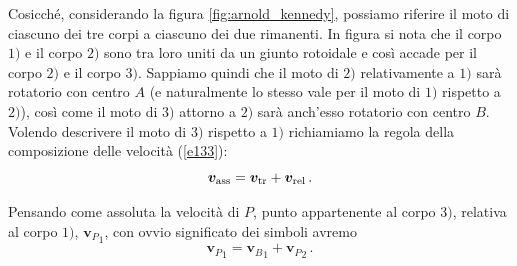 \noindent Cosicch\'e, considerando la figura \ref{fig:arnold_kennedy}, 
possiamo riferire il moto di ciascuno dei tre corpi a ciascuno dei due
rimanenti. In figura si nota che il corpo $1)$ e il corpo $2)$ sono
tra loro uniti da un giunto rotoidale e cos\`i accade per il corpo $2)$ e
il corpo $3)$. Sappiamo quindi che il moto di $2)$ relativamente a $1)$
sar\`a rotatorio con centro $A$ (e naturalmente lo stesso vale per il 
moto di $1)$ rispetto a $2)$), cos\`i come il moto di $3)$ attorno
a $2)$ sar\`a anch'esso rotatorio con centro $B$. 
Volendo descrivere il moto di $3)$ rispetto a $1)$ richiamiamo la regola della
composizione delle velocit\`a (\ref{e133}):
\begin{equation}
{\bm v}_{\rm ass} = {\bm v}_{\rm tr} + {\bm v}_{\rm rel}\,.
\nonumber
\end{equation}

\noindent Pensando come assoluta la velocit\`a
di $P$, punto  appartenente al corpo  $3)$,
relativa al corpo $1)$, ${{\bm v}_{\scriptscriptstyle P}}_{\scriptscriptstyle 1}$, con ovvio significato dei 
simboli avremo  
\begin{equation}
{{\bm v}_{\scriptscriptstyle P}}_{\scriptscriptstyle 1} = {{\bm v}_{\scriptscriptstyle B}}_{\scriptscriptstyle 1} + {{\bm v}_{\scriptscriptstyle P}}_{\scriptscriptstyle 2}\,.
\label{eq:vel_p}
\end{equation}

